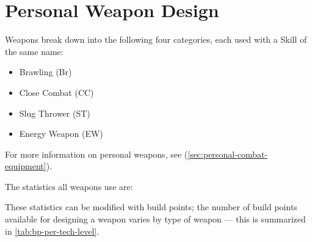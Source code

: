 \section{Personal Weapon Design}\label{sec:personal-weapon-design}

Weapons break down into the following four categories, each used with a Skill of the same name:

\begin{itemize}
\item Brawling (Br)
\item Close Combat (CC)
\item Slug Thrower (ST)
\item Energy Weapon (EW)
\end{itemize}

For more information on personal weapons, see  (\autoref{sec:personal-combat-equipment}).

The statistics all weapons use are:




These statistics can be modified with build points; the number of build points available for designing a weapon varies by type of weapon --- this is summarized in \autoref{tab:bp-per-tech-level}.










